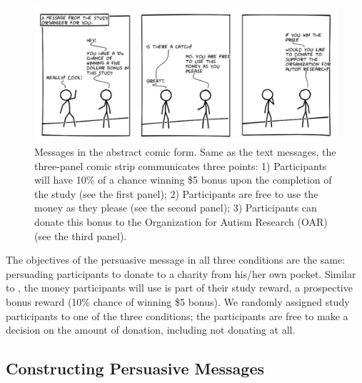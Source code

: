 \begin{figure}[bt]
    \centering
    \includegraphics[width=\columnwidth]{./figures/abstract_comic.png}
    \caption{Messages in the abstract comic form. Same as the text messages, the three-panel comic strip communicates three points: 1) Participants will have 10\% of a chance winning \$5 bonus upon the completion of the study (see the first panel); 2) Participants are free to use the money as they please (see the second panel); 3) Participants can donate this bonus to the Organization for Autism Research (OAR) (see the third panel).}
    \label{fig:basic three comic panel}
\end{figure}

The objectives of the persuasive message in all three conditions are the same: persuading participants to donate to a charity from his/her own pocket. Similar to \textcite{lee2013does,saunders2016no}, the money participants will use is part of their study reward, a prospective bonus reward (10\% chance of winning \$5 bonus). We randomly assigned study participants to one of the three conditions; the participants are free to make a decision on the amount of donation, including not donating at all.




\subsection{Constructing Persuasive Messages}
\label{sub:Constructing Persuasive Messages}





